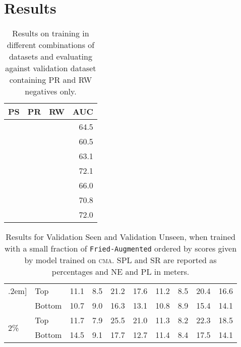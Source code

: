 \documentclass[10pt,twocolumn,letterpaper]{article}
\newcommand{\friedaug}{\texttt{Fried-Augmented}}
\newcommand{\cmark}{\ding{51}}\newcommand{\xmark}{\ding{55}}\newcommand{\taskcma}{\textsc{cma}}
\begin{document}
\section{Results}
\label{sec:results}

\begin{table}
\centering
\begin{tabular}{lll|r}
 PS        & PR        & RW         & AUC \\
\hline
 \cmark    &           &            & 64.5 \\
           & \cmark    &            & 60.5 \\
           &           & \cmark     & 63.1 \\
 \cmark    & \cmark    &            & 72.1 \\
           & \cmark    & \cmark     & 66.0 \\ 
 \cmark    &           & \cmark     & 70.8 \\
 \cmark    & \cmark    & \cmark     & 72.0 \\
\end{tabular}
\caption{Results on training in different combinations of datasets and evaluating against validation dataset containing PR and RW negatives only.\label{tab:sampling-strategy}}
\end{table}

\begin{table*}
\centering
\setlength\tabcolsep{4.5pt}
\begin{tabular}{llcccccccc}\0.2em]\Xhline{2\arrayrulewidth}            
\multirow{2}{*}{1\%}   & Top                   & 11.1 & 8.5 & 21.2 & 17.6 & 11.2 & 8.5 & 20.4 & 16.6  \\
                       & Bottom                & 10.7 & 9.0 & 16.3 & 13.1 & 10.8 & 8.9 & 15.4 & 14.1  \\
\hline 
\multirow{2}{*}{2\%}   & Top                   & 11.7 & 7.9 & 25.5 & 21.0 & 11.3 & 8.2 & 22.3 & 18.5 \\
                       & Bottom                & 14.5 & 9.1 & 17.7 & 12.7 & 11.4 & 8.4 & 17.5 & 14.1  \\   
\end{tabular}
\caption{Results for Validation Seen and Validation Unseen, when trained with a small fraction of {\friedaug} ordered by scores given by model trained on {\taskcma}. SPL and SR are reported as percentages and NE and PL in meters.}
\label{tab:r2r-small-dataset}
\end{table*}
\end{document}
